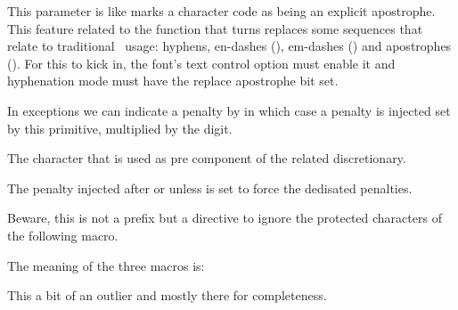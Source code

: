 \starttyping
\everyvbox{\kern10pt\everyvbox{}}
\stoptyping

\stopoldprimitive

\startnewprimitive[title={\prm {exapostrophechar}}]

This parameter is like  marks a character code as being an
explicit apostrophe. This feature related to the 
function that turns replaces some sequences that relate to traditional \TEX\
usage: hyphens, en-dashes (), em-dashes () and
apostrophes (\type {U+2019}). For this to kick in, the font's text control option
must enable it and hyphenation mode must have the replace apostrophe bit set.

\stopnewprimitive

\startnewprimitive[title={\prm {exceptionpenalty}}]

In exceptions we can indicate a penalty by \type {[digit]} in which case a
penalty is injected set by this primitive, multiplied by the digit.

\stopnewprimitive

\startoldprimitive[title={\prm {exhyphenchar}}]

The character that is used as pre component of the related discretionary.

\stopoldprimitive

\startoldprimitive[title={\prm {exhyphenpenalty}}]

The penalty injected after \type {-} or \type {\-} unless 
is set to force the dedisated penalties.

\stopoldprimitive

\startnewprimitive[title={\prm {expand}}]

Beware, this is not a prefix but a directive to ignore the protected characters of
the following macro.

\startbuffer
\protected \def \testa{\the\scratchcounter}
           \edef\testb{\testa}
           \edef\testc{\expand\testa}
\stopbuffer

\typebuffer

The meaning of the three macros is:

\startlines \getbuffer \tttf
\meaningfull\testa
\meaningfull\testb
\meaningfull\testc
\stoplines

\stopnewprimitive

\startnewprimitive[title={\prm {expandactive}}]

This a bit of an outlier and mostly there for completeness.

